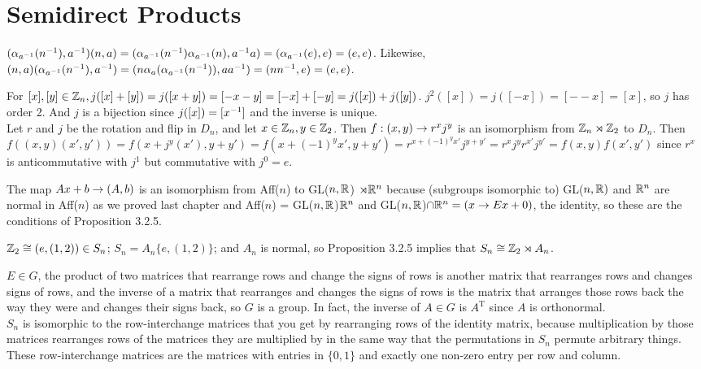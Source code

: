 \documentclass[11pt, oneside]{article}   	%
\begin{document}
\section{Semidirect Products}
\be
\item $(\alpha_{a^{-1}}(n^{-1}), a^{-1})(n, a) = (\alpha_{a^{-1}}(n^{-1})\alpha_{a^{-1}}(n), a^{-1} a) = (\alpha_{a^{-1}}(e), e) = (e, e)$. Likewise, $(n, a)(\alpha_{a^{-1}}(n^{-1}), a^{-1}) = (n\alpha_a(\alpha_{a^{-1}}(n^{-1})), aa^{-1}) = (nn^{-1}, e) = (e, e)$.
\item For $[x], [y] \in \mathbb{Z}_n, j([x] + [y]) = j([x + y]) = [-x - y] = [-x] + [-y] = j([x]) + j([y])$. $j^2([x]) = j([-x]) = [--x] = [x]$, so $j$ has order 2. And $j$ is a bijection since $j([x]) = [x^{-1}]$ and the inverse is unique. \\
Let $r$ and $j$ be the rotation and flip in $D_n$, and let $x \in \mathbb{Z}_n, y \in \mathbb{Z}_2$. Then $f: (x, y) \rightarrow r^xj^y$ is an isomorphism from $\mathbb{Z}_n \rtimes \mathbb{Z}_2$ to $D_n$. Then $f((x, y)(x', y')) = f(x + j^y(x'), y + y') = f(x + (-1)^yx', y+y') = r^{x + (-1)^yx'}j^{y+y'} = r^xj^yr^{x'}j^{y'} = f(x, y)f(x', y')$ since $r^x$ is anticommutative with $j^1$ but commutative with $j^0 = e$.
\item The map $Ax + b \rightarrow (A, b)$ is an isomorphism from Aff($n$) to GL($n, \mathbb{R}$) $\rtimes \mathbb{R}^n$ because (subgroups isomorphic to) GL($n, \mathbb{R})$ and $\mathbb{R}^n$ are normal in Aff($n$) as we proved last chapter and Aff($n$) = GL($n, \mathbb{R}$)$\mathbb{R}^n$ and GL($n, \mathbb{R}$)$\cap \mathbb{R}^n = (x \rightarrow Ex + 0)$, the identity, so these are the conditions of Proposition 3.2.5.
\item $\mathbb{Z}_2 \cong (e, (1, 2)) \in S_n$; $S_n = A_n\{e, (1, 2)\}$; and $A_n$ is normal, so Proposition 3.2.5 implies that $S_n \cong \mathbb{Z}_2 \rtimes A_n$.
\item $E\in G$, the product of two matrices that rearrange rows and change the signs of rows is another matrix that rearranges rows and changes signs of rows, and the inverse of a matrix that rearranges and changes the signs of rows is the matrix that arranges those rows back the way they were and changes their signs back, so $G$ is a group. In fact, the inverse of $A \in G$ is $A^\text{T}$ since $A$ is orthonormal. \\
 $S_n$ is isomorphic to the row-interchange matrices that you get by rearranging rows of the identity matrix, because multiplication by those matrices rearranges rows of the matrices they are multiplied by in the same way that the permutations in $S_n$ permute arbitrary things. These row-interchange matrices are the matrices with entries in $\{0, 1\}$ and exactly one non-zero entry per row and column. \\
\end{document}
